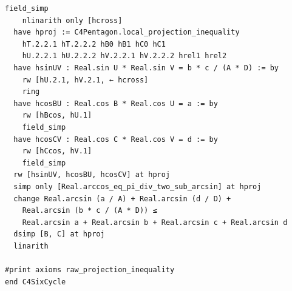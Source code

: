 \documentclass[11pt,a4paper]{article}
\begin{document}
\begin{Verbatim}[breaklines,breakanywhere,fontsize=\footnotesize]
    field_simp
    nlinarith only [hcross]
  have hproj := C4Pentagon.local_projection_inequality
    hT.2.2.1 hT.2.2.2 hB0 hB1 hC0 hC1
    hU.2.2.1 hU.2.2.2 hV.2.2.1 hV.2.2.2 hrel1 hrel2
  have hsinUV : Real.sin U * Real.sin V = b * c / (A * D) := by
    rw [hU.2.1, hV.2.1, ← hcross]
    ring
  have hcosBU : Real.cos B * Real.cos U = a := by
    rw [hBcos, hU.1]
    field_simp
  have hcosCV : Real.cos C * Real.cos V = d := by
    rw [hCcos, hV.1]
    field_simp
  rw [hsinUV, hcosBU, hcosCV] at hproj
  simp only [Real.arccos_eq_pi_div_two_sub_arcsin] at hproj
  change Real.arcsin (a / A) + Real.arcsin (d / D) +
    Real.arcsin (b * c / (A * D)) ≤
    Real.arcsin a + Real.arcsin b + Real.arcsin c + Real.arcsin d
  dsimp [B, C] at hproj
  linarith

#print axioms raw_projection_inequality
end C4SixCycle
\end{Verbatim}
\end{document}
